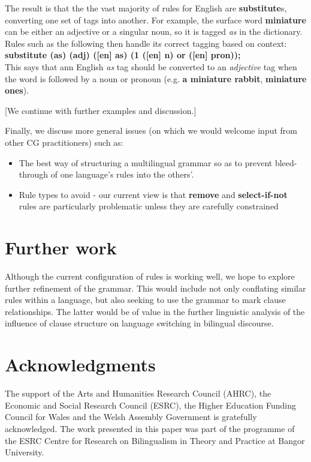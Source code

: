 \documentclass[11pt]{article}
\begin{document}
The result is that the the vast majority of rules for English are \textbf{substitute}s, converting one set of tags into another.  For example, the surface word \textbf{miniature} can be either an adjective or a singular noun, so it is tagged \textit{as} in the dictionary.  Rules such as the following then handle its correct tagging based on context:\\
\indent\textbf{substitute (as) (adj) ([en] as) (1 ([en] n) or ([en] pron));}\\
This says that ann English \textit{as} tag should be converted to an \textit{adjective} tag when the word is followed by a noun or pronoun (e.g. \textbf{a miniature rabbit}, \textbf{miniature ones}).

[We continue with further examples and discussion.]

Finally, we discuss more general issues (on which we would welcome input from other CG practitioners) such as:
\begin{itemize}
\item The best way of structuring a multilingual grammar so as to prevent bleed-through of one language's rules into the others'.
\item Rule types to avoid - our current view is that \textbf{remove} and \textbf{select-if-not} rules are particularly problematic unless they are carefully constrained
\end{itemize}

\section{Further work}
\label{sec:further}

Although the current configuration of rules is working well, we hope to explore further refinement of the grammar.  This would include not only conflating similar rules within a language, but also seeking to use the grammar to mark clause relationships.  The latter would be of value in the further linguistic analysis of the influence of clause structure on language switching in bilingual discourse.


\section*{Acknowledgments}

The support of the Arts and Humanities Research Council (AHRC), the Economic and Social Research Council (ESRC), the Higher Education Funding Council for Wales and the Welsh Assembly Government is gratefully acknowledged. The work presented in this paper was part of the programme of the ESRC Centre for Research on Bilingualism in Theory and Practice at Bangor University.
\end{document}
